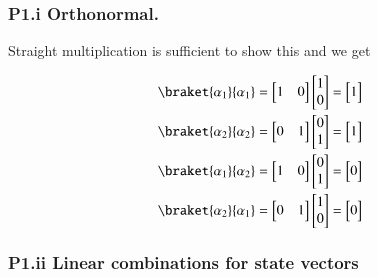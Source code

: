 \subsubsection{P1.i Orthonormal.}

Straight multiplication is sufficient to show this and we get

\begin{align*}
\braket{\alpha_1}{\alpha_1} &= 
\begin{bmatrix}
1 & 0
\end{bmatrix} 
\begin{bmatrix}
1 \\
0
\end{bmatrix} =
\begin{bmatrix}
1
\end{bmatrix} \\
\braket{\alpha_2}{\alpha_2} &= 
\begin{bmatrix}
0 & 1
\end{bmatrix} 
\begin{bmatrix}
0 \\
1
\end{bmatrix} =
\begin{bmatrix}
1
\end{bmatrix} \\
\braket{\alpha_1}{\alpha_2} &= 
\begin{bmatrix}
1 & 0
\end{bmatrix} 
\begin{bmatrix}
0 \\
1
\end{bmatrix} =
\begin{bmatrix}
0
\end{bmatrix} \\
\braket{\alpha_2}{\alpha_1} &= 
\begin{bmatrix}
0 & 1
\end{bmatrix} 
\begin{bmatrix}
1 \\
0
\end{bmatrix} =
\begin{bmatrix}
0
\end{bmatrix} \\
\end{align*}

\subsubsection{P1.ii Linear combinations for state vectors}

